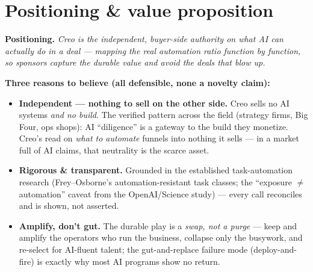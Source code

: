 \documentclass[11pt]{article}
\begin{document}
\section{Positioning \& value proposition}
\textbf{Positioning.} \emph{Creo is the independent, buyer-side authority on what AI can actually
do in a deal --- mapping the real automation ratio function by function, so sponsors capture the
durable value and avoid the deals that blow up.}

\textbf{Three reasons to believe (all defensible, none a novelty claim):}
\begin{itemize}
  \item \textbf{Independent --- nothing to sell on the other side.} Creo sells no AI systems
  \emph{and no build}. The verified pattern across the field (strategy firms, Big Four, ops shops):
  AI ``diligence'' is a gateway to the build they monetize. Creo's read on \emph{what to automate}
  funnels into nothing it sells --- in a market full of AI claims, that neutrality is the scarce asset.
  \item \textbf{Rigorous \& transparent.} Grounded in the established task-automation research
  (Frey--Osborne's automation-resistant task classes; the ``exposure $\neq$ automation'' caveat
  from the OpenAI/Science study) --- every call reconciles and is shown, not asserted.
  \item \textbf{Amplify, don't gut.} The durable play is a \emph{swap, not a purge} --- keep and
  amplify the operators who run the business, collapse only the busywork, and re-select for
  AI-fluent talent; the gut-and-replace failure mode (deploy-and-fire) is exactly why most AI
  programs show no return.
\end{itemize}

\end{document}

